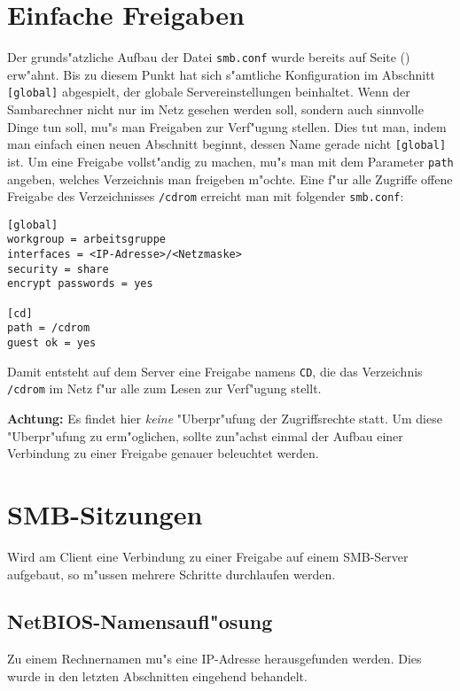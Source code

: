 \documentclass{scrartcl}
\newcommand{\datei}{\texttt}
\begin{document}
\section{Einfache Freigaben}

Der grunds"atzliche Aufbau der Datei \datei{smb.conf} wurde bereits
auf Seite (\pageref{aufbau-smb.conf}) erw"ahnt. Bis zu diesem Punkt
hat sich s"amtliche Konfiguration im Abschnitt \texttt{[global]}
abgespielt, der globale Servereinstellungen beinhaltet. Wenn der
Sambarechner nicht nur im Netz gesehen werden soll, sondern auch
sinnvolle Dinge tun soll, mu"s man Freigaben zur Verf"ugung stellen.
Dies tut man, indem man einfach einen neuen Abschnitt beginnt, dessen
Name gerade nicht \texttt{[global]} ist. Um eine Freigabe vollst"andig
zu machen, mu"s man mit dem Parameter \texttt{path} angeben, welches
Verzeichnis man freigeben m"ochte. Eine f"ur alle Zugriffe offene
Freigabe des Verzeichnisses \datei{/cdrom} erreicht man mit folgender
\datei{smb.conf}:

\begin{verbatim}
[global]
workgroup = arbeitsgruppe
interfaces = <IP-Adresse>/<Netzmaske>
security = share
encrypt passwords = yes

[cd]
path = /cdrom
guest ok = yes
\end{verbatim}

\noindent
Damit entsteht auf dem Server eine Freigabe namens \texttt{CD}, die
das Verzeichnis \datei{/cdrom} im Netz f"ur alle zum Lesen zur
Verf"ugung stellt.

\textbf{Achtung:} 
Es findet hier \emph{keine} "Uberpr"ufung der Zugriffsrechte statt. Um
diese "Uberpr"ufung zu erm"oglichen, sollte zun"achst einmal der
Aufbau einer Verbindung zu einer Freigabe genauer beleuchtet werden.

\section{SMB-Sitzungen}

Wird am Client eine Verbindung zu einer Freigabe auf einem SMB-Server
aufgebaut, so m"ussen mehrere Schritte durchlaufen werden.

\subsection*{NetBIOS-Namensaufl"osung}

Zu einem Rechnernamen mu"s eine IP-Adresse herausgefunden werden. Dies
wurde in den letzten Abschnitten eingehend behandelt.
\end{document}
